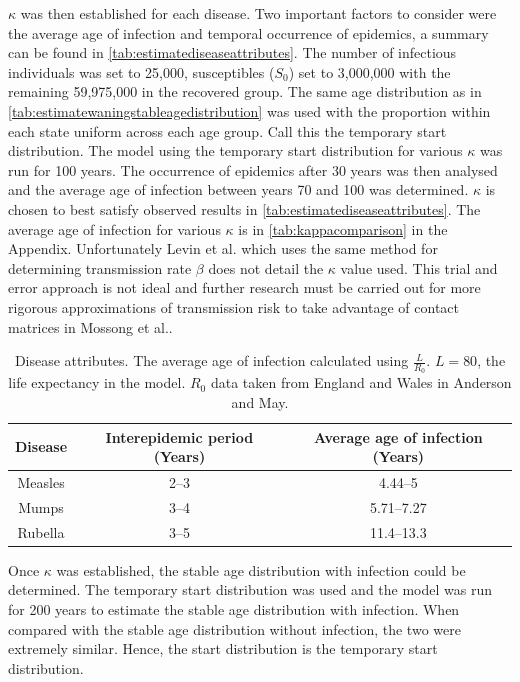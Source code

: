 \documentclass[a4paper,11pt] {scrartcl}
\begin{document}
$\kappa$ was then established for each disease. Two important factors to consider were the average age of infection and temporal occurrence of epidemics, a summary can be found in \autoref{tab:estimatediseaseattributes}. The number of infectious individuals was set to 25,000, susceptibles ($S_0$) set to 3,000,000 with the remaining 59,975,000 in the recovered group. The same age distribution as in \autoref{tab:estimatewaningstableagedistribution} was used with the proportion within each state uniform across each age group. Call this the temporary start distribution. The model using the temporary start distribution for various $\kappa$ was run for 100 years. The occurrence of epidemics after 30 years was then analysed and the average age of infection between years 70 and 100 was determined. $\kappa$ is chosen to best satisfy observed results in \autoref{tab:estimatediseaseattributes}. The average age of infection for various $\kappa$ is in \autoref{tab:kappacomparison} in the Appendix. Unfortunately Levin et al.\cite{levin2011global} which uses the same method for determining transmission rate $\beta$ does not detail the $\kappa$ value used. This trial and error approach is not ideal and further research must be carried out for more rigorous approximations of transmission risk to take advantage of contact matrices in Mossong et al.\cite{mossong2008social}. 

\begin{table} [h]
\centering
\begin{tabular}{c c c}
\toprule
Disease & Interepidemic period (Years)\cite{anderson1985age} & Average age of infection (Years)\\
\midrule
Measles & 2--3 & 4.44--5\\
Mumps & 3--4 & 5.71--7.27\\
Rubella & 3--5 & 11.4--13.3\\
\bottomrule
\end{tabular}
\caption{Disease attributes. The average age of infection calculated using $\frac{L}{R_0}$. $L=80$, the life expectancy in the model. $R_0$ data taken from England and Wales in Anderson and May\cite{anderson1991infectioustable}.}
\label{tab:estimatediseaseattributes}
\end{table}

Once $\kappa$ was established, the stable age distribution with infection could be determined. The temporary start distribution was used and the model was run for 200 years to estimate the stable age distribution with infection. When compared with the stable age distribution without infection, the two were extremely similar. Hence, the start distribution is the temporary start distribution.
\end{document}
